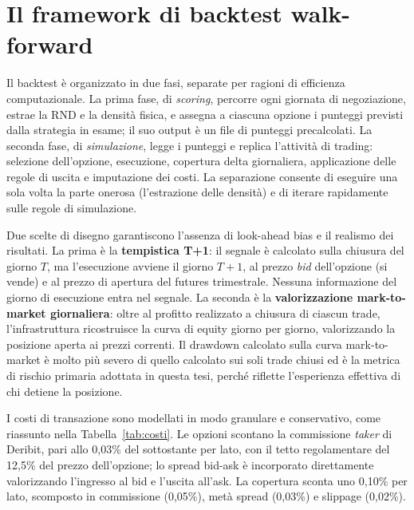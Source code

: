 \section{Il framework di backtest walk-forward}
\label{sec:dati-backtest}

Il backtest è organizzato in due fasi, separate per ragioni di efficienza
computazionale. La prima fase, di \emph{scoring}, percorre ogni giornata di
negoziazione, estrae la RND e la densità fisica, e assegna a ciascuna
opzione i punteggi previsti dalla strategia in esame; il suo output è un
file di punteggi precalcolati. La seconda fase, di \emph{simulazione},
legge i punteggi e replica l'attività di trading: selezione dell'opzione,
esecuzione, copertura delta giornaliera, applicazione delle regole di
uscita e imputazione dei costi. La separazione consente di eseguire una
sola volta la parte onerosa (l'estrazione delle densità) e di iterare
rapidamente sulle regole di simulazione.

Due scelte di disegno garantiscono l'assenza di look-ahead bias e il
realismo dei risultati. La prima è la \textbf{tempistica T+1}: il segnale è
calcolato sulla chiusura del giorno $T$, ma l'esecuzione avviene il giorno
$T+1$, al prezzo \emph{bid} dell'opzione (si vende) e al prezzo di apertura
del futures trimestrale. Nessuna informazione del giorno di esecuzione
entra nel segnale. La seconda è la \textbf{valorizzazione mark-to-market
giornaliera}: oltre al profitto realizzato a chiusura di ciascun trade,
l'infrastruttura ricostruisce la curva di equity giorno per giorno,
valorizzando la posizione aperta ai prezzi correnti. Il drawdown calcolato
sulla curva mark-to-market è molto più severo di quello calcolato sui soli
trade chiusi ed è la metrica di rischio primaria adottata in questa tesi,
perché riflette l'esperienza effettiva di chi detiene la posizione.

I costi di transazione sono modellati in modo granulare e conservativo, come
riassunto nella Tabella~\ref{tab:costi}. Le opzioni scontano la commissione
\emph{taker} di Deribit, pari allo 0,03\% del sottostante per lato, con il
tetto regolamentare del 12,5\% del prezzo dell'opzione; lo spread bid-ask è
incorporato direttamente valorizzando l'ingresso al bid e l'uscita all'ask.
La copertura sconta uno 0,10\% per lato, scomposto in commissione (0,05\%),
metà spread (0,03\%) e slippage (0,02\%).

